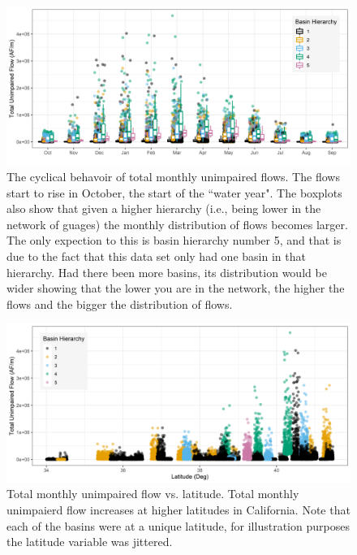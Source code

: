 \begin{figure}
	\centering
	\includegraphics[width=\textwidth, trim={0 0 0 0}, clip=true]{plots/rplot04_boxplot.png}
	\caption{The cyclical behavoir of total monthly unimpaired flows. The flows start to rise in October, the start of the ``water year". The boxplots also show that given a higher hierarchy (i.e., being lower in the network of guages) the monthly distribution of flows becomes larger. The only expection to this is basin hierarchy number 5, and that is due to the fact that this data set only had one basin in that hierarchy. Had there been more basins, its distribution would be wider showing that the lower you are in the network, the higher the flows and the bigger the distribution of flows.} 
	\label{fig:monthlyboxplot}
\end{figure}

\begin{figure}
	\centering
	\includegraphics[width=\textwidth, trim={0 0 0 0}, clip=true]{plots/rplot05_flowvslat.png}
	\caption{Total monthly unimpaired flow vs. latitude. Total monthly unimpaierd flow increases at higher latitudes in California. Note that each of the basins were at a unique latitude, for illustration purposes the latitude variable was jittered.} 
	\label{fig:flowvslat}
\end{figure}

